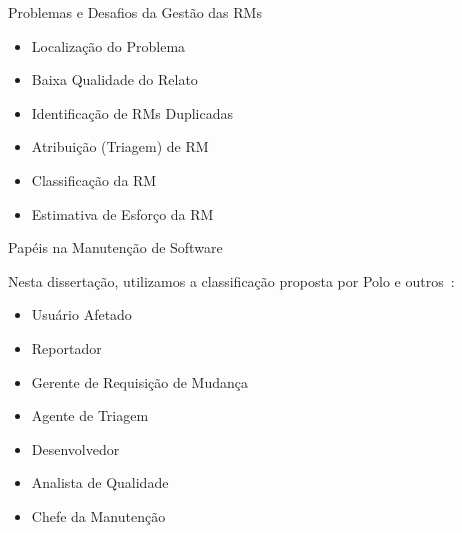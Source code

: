 \documentclass[t,14pt,mathserif]{beamer}
\begin{document}



\begin{frame}{Problemas e Desafios da Gestão das RMs}
	\begin{itemize}

        \item Localização do Problema
        \item Baixa Qualidade do Relato
        \item Identificação de RMs Duplicadas
        \item Atribuição (Triagem) de RM
        \item Classificação da RM
        \item Estimativa de Esforço da RM

	\end{itemize}
\end{frame}

\begin{frame}{Papéis na Manutenção de Software}

    Nesta dissertação, utilizamos a classificação proposta por Polo e
    outros~\cite{Polo1999}:

	\begin{itemize}
        \item Usuário Afetado
        \item Reportador
        \item Gerente de Requisição de Mudança
        \item Agente de Triagem
        \item Desenvolvedor
        \item Analista de Qualidade
        \item Chefe da Manutenção
    \end{itemize}

\end{frame}
\end{document}
